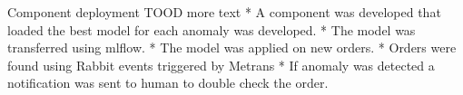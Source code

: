 \chap Component deployment
TOOD more text
\begitems
* A component was developed that loaded the best model for each anomaly was developed.
* The model was transferred using mlflow.
* The model was applied on new orders.
* Orders were found using Rabbit events triggered by Metrans
* If anomaly was detected a notification was sent to human to double check the order.
\enditems